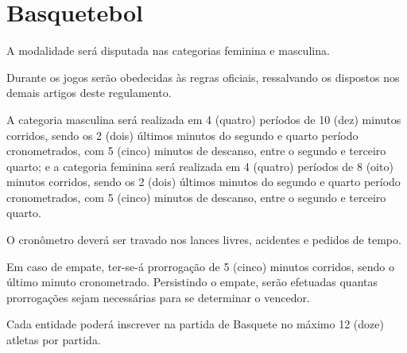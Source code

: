 {\let\clearpage\relax \chapter{Basquetebol}}

\begin{article}
	A modalidade será disputada nas categorias feminina e masculina.
\end{article}

\begin{article}
	Durante os jogos serão obedecidas às regras oficiais, ressalvando os dispostos nos demais artigos deste regulamento.
\end{article}

\begin{article}
	A categoria masculina será realizada em 4 (quatro) períodos de 10 (dez) minutos corridos, sendo os 2 (dois) últimos minutos do segundo e quarto período cronometrados, com 5 (cinco) minutos de descanso, entre o segundo e terceiro quarto; e a categoria feminina será realizada em 4 (quatro) períodos de 8 (oito) minutos corridos, sendo os 2 (dois) últimos minutos do segundo e quarto período cronometrados, com 5 (cinco) minutos de descanso, entre o segundo e terceiro quarto.

	\begin{xparagraph}
		O cronômetro deverá ser travado nos lances livres, acidentes e pedidos de tempo.
	\end{xparagraph}

	\begin{xparagraph}
		Em caso de empate, ter-se-á prorrogação de 5 (cinco) minutos corridos, sendo o último minuto cronometrado. Persistindo o empate, serão efetuadas quantas prorrogações sejam necessárias para se determinar o vencedor.
	\end{xparagraph}
\end{article}

\begin{article}
	Cada entidade poderá inscrever na partida de Basquete no máximo 12 (doze) atletas por partida.
\end{article}
